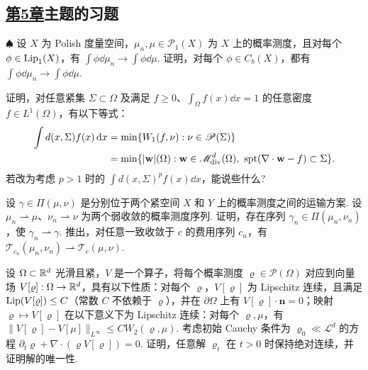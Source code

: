 \subsection*{\hyperref[sec:5]{第5章}主题的习题}
\begin{exercise}\label{ex:31}
$\spadesuit$ 设 $X$ 为 Polish 度量空间，$\mu_n,\mu\in\mathscr P_1(X)$ 为 $X$ 上的概率测度，且对每个 $\phi\in\operatorname{Lip}_1(X)$，有 $\int\phi\dd\mu_n\to\int\phi\dd\mu$. 证明，对每个 $\phi\in C_b(X)$，都有 $\int\phi\dd\mu_n\to\int\phi\dd\mu$.
\end{exercise}

\begin{exercise}\label{ex:32}
证明，对任意紧集 $\Sigma\subset\Omega$ 及满足 $f\geq0$、$\int_\Omega f(x)\dd x=1$ 的任意密度 $f\in L^1(\Omega)$，有以下等式：
\[
\begin{aligned}
\int d(x,\Sigma)f(x)\,\mathrm d x
&=\min\{W_1(f,\nu):\nu\in\mathscr P(\Sigma)\}\\
&=\min\{|\mathbf w|(\Omega):\mathbf w\in\mathscr M_{\mathrm{div}}^d(\Omega),\ \operatorname{spt}(\nabla\cdot\mathbf w-f)\subset\Sigma\}.
\end{aligned}
\]
若改为考虑 $p>1$ 时的 $\int d(x,\Sigma)^pf(x)\dd x$，能说些什么?
\end{exercise}

\begin{exercise}\label{ex:33}
设 $\gamma\in\Pi(\mu,\nu)$ 是分别位于两个紧空间 $X$ 和 $Y$ 上的概率测度之间的运输方案. 设 $\mu_n\rightharpoonup\mu$、$\nu_n\rightharpoonup\nu$ 为两个弱收敛的概率测度序列. 证明，存在序列 $\gamma_n\in\Pi(\mu_n,\nu_n)$，使 $\gamma_n\rightharpoonup\gamma$. 推出，对任意一致收敛于 $c$ 的费用序列 $c_n$，有 $\mathscr T_{c_n}(\mu_n,\nu_n)\rightharpoonup\mathscr T_c(\mu,\nu)$.
\end{exercise}

\begin{exercise}\label{ex:34}
设 $\Omega\subset\mathbb R^d$ 光滑且紧，$V$ 是一个算子，将每个概率测度 $\varrho\in\mathscr P(\Omega)$ 对应到向量场 $V[\varrho]:\Omega\to\mathbb R^d$，具有以下性质：对每个 $\varrho$，$V[\varrho]$ 为 Lipschitz 连续，且满足 $\operatorname{Lip}(V[\varrho])\leq C$（常数 $C$ 不依赖于 $\varrho$），并在 $\partial\Omega$ 上有 $V[\varrho]\cdot\mathbf n=0$；映射 $\varrho\mapsto V[\varrho]$ 在以下意义下为 Lipschitz 连续：对每个 $\varrho,\mu$，有 $\|V[\varrho]-V[\mu]\|_{L^\infty}\leq CW_2(\varrho,\mu)$. 考虑初始 Cauchy 条件为 $\varrho_0\ll\mathscr L^d$ 的方程 $\partial_t\varrho+\nabla\cdot(\varrho V[\varrho])=0$. 证明，任意解 $\varrho_t$ 在 $t>0$ 时保持绝对连续，并证明解的唯一性.
\end{exercise}

